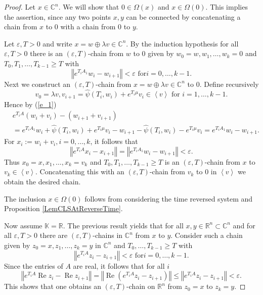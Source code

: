 \documentclass[10pt,a4paper]{amsart}
\begin{document}
\begin{proof}
Let $x\in\mathbb{C}^{n}$. We will show that $0\in\Omega(x)$ and $x\in
\Omega(0)$. This implies the assertion, since any two points $x,y$ can be
connected by concatenating a chain from $x$ to $0$ with a chain from $0$ to
$y$.

Let $\varepsilon,T>0$ and write $x=w\oplus\lambda v\in\mathbb{C}^{n}$. By the
induction hypothesis for all $\varepsilon,T>0$ there is an $(\varepsilon
,T)$-chain from $w$ to $0$ given by $w_{0}=w,w_{1},\ldots,\allowbreak w_{k}=0$
and $T_{0},T_{1},\ldots,T_{k-1}\geq T$ with%
\[
\left\Vert e^{T_{i}A_{1}}w_{i}-w_{i+1}\right\Vert <\varepsilon\text{ for
}i=0,\ldots,k-1.
\]
Next we construct an $(\varepsilon,T)$-chain from $x=w\oplus\lambda
v\in\mathbb{C}^{n}$ to $0$. Define recursively%
\[
v_{0}=\lambda v,v_{i+1}=\widehat{\psi}(T_{i},w_{i})+e^{T_{i}\mu}v_{i}%
\in\left\langle v\right\rangle \text{ for }i=1,\ldots,k-1.
\]
Hence by (\ref{e_1})%
\begin{align}
&  e^{T_{i}A}(w_{i}+v_{i})-(w_{i+1}+v_{i+1})\label{e_2}\\
&  =e^{T_{i}A_{1}}w_{i}+\widehat{\psi}(T_{i},w_{i})+e^{T_{i}\mu}v_{i}%
-w_{i+1}-\widehat{\psi}(T_{i},w_{i})-e^{T_{i}\mu}v_{i}=e^{T_{i}A_{1}}%
w_{i}-w_{i+1}.\nonumber
\end{align}
For $x_{i}:=w_{i}+v_{i},i=0,\ldots,k$, it follows that%
\[
\left\Vert e^{T_{i}A}x_{i}-x_{i+1}\right\Vert =\left\Vert e^{T_{i}A_{1}}%
w_{i}-w_{i+1}\right\Vert <\varepsilon.
\]
Thus $x_{0}=x,x_{1},\ldots,x_{k}=v_{k}$ and $T_{0},T_{1},\ldots,T_{k-1}\geq T$
is an $(\varepsilon,T)$-chain from $x$ to $v_{k}\in\left\langle v\right\rangle
$. Concatenating this with an $(\varepsilon,T)$-chain from $v_{k}$ to $0$ in
$\left\langle v\right\rangle $ we obtain the desired chain.

The inclusion $x\in\Omega(0)$ follows from considering the time reversed
system and Proposition \ref{LemCLSAtReverseTime}.

Now assume $\mathbb{K}=\mathbb{R}$. The previous result yields that for all
$x,y\in\mathbb{R}^{n}\subset\mathbb{C}^{n}$ and for all $\varepsilon,T>0$
there are $(\varepsilon,T)$-chains in $\mathbb{C}^{n}$ from $x$ to $y$.
Consider such a chain given by $z_{0}=x,z_{1},\ldots,z_{k}=y$ in
$\mathbb{C}^{n}$ and $T_{0},\ldots,T_{k-1}\geq T$ with%
\[
\left\Vert e^{T_{i}A}z_{i}-z_{i+1}\right\Vert <\varepsilon\text{ for
}i=0,\ldots,k-1.
\]
Since the entries of $A$ are real, it follows that for all $i$%
\[
\left\Vert e^{T_{i}A}\operatorname{Re}z_{i}-\operatorname{Re}z_{i+1}%
\right\Vert =\left\Vert \operatorname{Re}\left(  e^{T_{i}A}z_{i}%
-z_{i+1}\right)  \right\Vert \leq\left\Vert e^{T_{i}A}z_{i}-z_{i+1}\right\Vert
<\varepsilon.
\]
This shows that one obtains an $(\varepsilon,T)$-chain on $\mathbb{R}^{n}$
from $z_{0}=x$ to $z_{k}=y$.
\end{proof}
\end{document}
